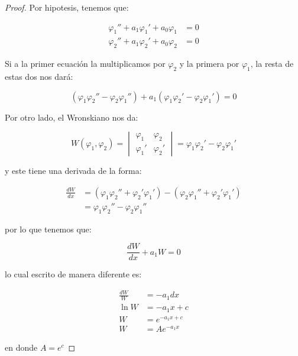 		\begin{proof}
			Por hipotesis, tenemos que:

			\begin{align*}
				\varphi_1'' + a_1 \varphi_1' + a_0 \varphi_1 &= 0 \\
				\varphi_2'' + a_1 \varphi_2' + a_0 \varphi_2 &= 0
			\end{align*}

			Si a la primer ecuación la multiplicamos por $\varphi_2$ y la primera por $\varphi_1$, la resta de estas dos nos dará:

			\begin{equation*}
				(\varphi_1 \varphi_2'' - \varphi_2 \varphi_1'') + a_1 (\varphi_1 \varphi_2' - \varphi_2 \varphi_1') = 0
			\end{equation*}

			Por otro lado, el Wronskiano nos da:

			\begin{equation*}
				W(\varphi_1, \varphi_2) =
				\begin{vmatrix}
					\varphi_1 & \varphi_2 \\
					\varphi_1' & \varphi_2'
				\end{vmatrix} = \varphi_1 \varphi_2' - \varphi_2 \varphi_1'
			\end{equation*}

			y este tiene una derivada de la forma:

			\begin{align*}
				\frac{d W}{dx} &= (\varphi_1 \varphi_2'' + \varphi_2' \varphi_1') - (\varphi_2 \varphi_1'' + \varphi_2' \varphi_1') \\
				&= \varphi_1 \varphi_2'' - \varphi_2 \varphi_1''
			\end{align*}

			por lo que tenemos que:

			\begin{equation*}
				\frac{dW}{dx} + a_1 W = 0
			\end{equation*}

			lo cual escrito de manera diferente es:

			\begin{align*}
				\frac{dW}{W} &= - a_1 dx \\
				\ln{W} &= -a_1 x + c \\
				W &= e^{-a_1 x + c} \\
				W &= A e^{-a_1 x}
			\end{align*}

			en donde $A = e^{c}$
		\end{proof}

